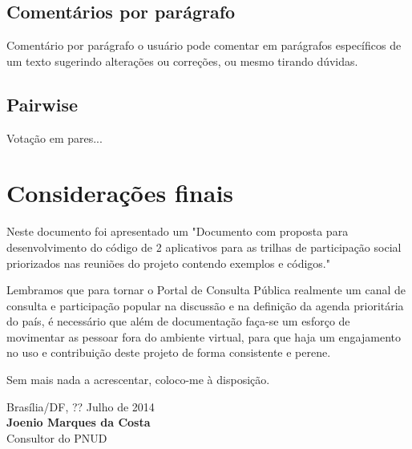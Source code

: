 \documentclass[12pt]{article}
\newcommand{\MyName}{Joenio Marques da Costa}
\newcommand{\ProductDescription}{"Documento com proposta para desenvolvimento
        do código de 2 aplicativos para as trilhas de participação social
        priorizados nas reuniões do projeto contendo exemplos e códigos."
}
\newcommand{\DataEntrega}{?? Julho de 2014}
\begin{document}
\subsection{Comentários por parágrafo}

Comentário por parágrafo o usuário pode comentar em parágrafos específicos de
um texto sugerindo alterações ou correções, ou mesmo tirando dúvidas.

\subsection{Pairwise}

Votação em pares...

\section{Considerações finais}

Neste documento foi apresentado um \ProductDescription

Lembramos que para tornar o Portal de Consulta Pública realmente um canal de
consulta e participação popular na discussão e na definição da agenda
prioritária do país, é necessário que além de documentação faça-se um esforço
de movimentar as pessoar fora do ambiente virtual, para que haja um
engajamento no uso e contribuição deste projeto de forma consistente e perene.

%

\vspace{1cm}

Sem mais nada a acrescentar, coloco-me à disposição.

\vspace{1cm}

\begin{minipage}{\textwidth}
  Brasília/DF, \DataEntrega\\[1cm]
  \textbf{\MyName}\\
  \small Consultor do PNUD
\end{minipage}
\end{document}
